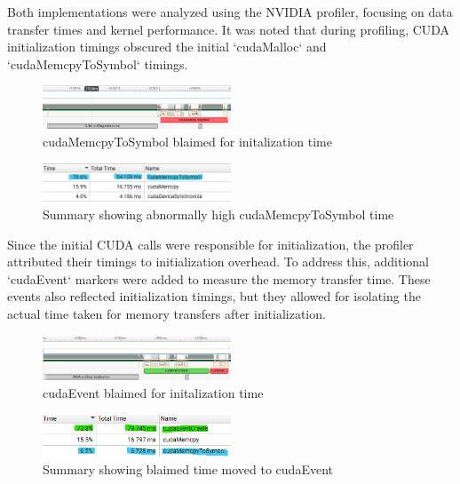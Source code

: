 \documentclass[journal,11pt]{IEEEtran}
\begin{document}
Both implementations were analyzed using the NVIDIA profiler, focusing on data transfer times and kernel performance. It was noted that during profiling, CUDA initialization timings obscured the initial `cudaMalloc` and `cudaMemcpyToSymbol` timings.
\vspace{-1.2em}\\
\begin{figure}[h]
    \centering
    \includegraphics[width=0.5\textwidth]{assets/blaimed-mem.png}
    \caption{cudaMemcpyToSymbol blaimed for initalization time}
    \label{fig:2}
\end{figure}
\vspace{-0.2em}
\begin{figure}[h]
    \centering
    \includegraphics[width=0.5\textwidth]{assets/blaimed-mem-sum.png}
    \caption{Summary showing abnormally high cudaMemcpyToSymbol time}
    \label{fig:3}
\end{figure}

Since the initial CUDA calls were responsible for initialization, the profiler attributed their timings to initialization overhead. To address this, additional `cudaEvent` markers were added to measure the memory transfer time. These events also reflected initialization timings, but they allowed for isolating the actual time taken for memory transfers after initialization.

\begin{figure}[h]
    \centering
    \includegraphics[width=0.5\textwidth]{assets/blaimed-event.png}
    \caption{cudaEvent blaimed for initalization time}
    \label{fig:4}
\end{figure}
\vspace{-0.2em}
\begin{figure}[h]
    \centering
    \includegraphics[width=0.5\textwidth]{assets/blaimed-event-sum.png}
    \caption{Summary showing blaimed time moved to cudaEvent}
    \label{fig:5}
\end{figure}
\end{document}
